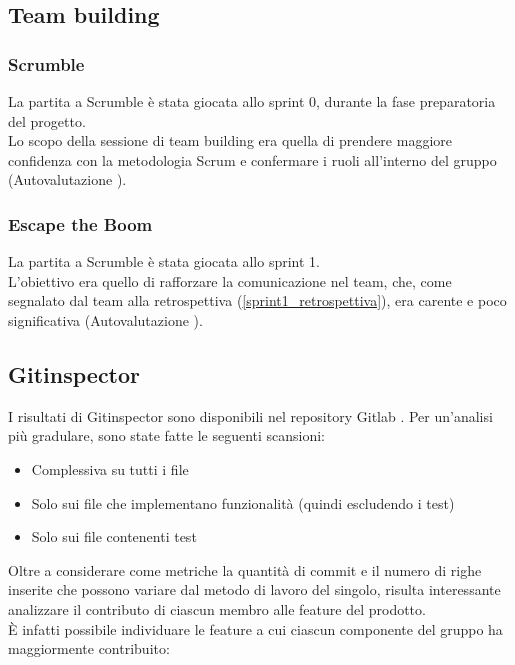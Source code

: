 \documentclass[11pt]{article}
\newcommand{\fref}[1]{\hyperref[#1]{\cref{#1}}}
\begin{document}
\subsection{Team building}
\subsubsection{Scrumble}
La partita a Scrumble è stata giocata allo sprint 0, durante la fase preparatoria del progetto.\\
Lo scopo della sessione di team building era quella di prendere maggiore confidenza con la metodologia Scrum e 
confermare i ruoli all'interno del gruppo (Autovalutazione \cite{gqm_scrumble}).

\subsubsection{Escape the Boom}
La partita a Scrumble è stata giocata allo sprint 1.\\
L'obiettivo era quello di rafforzare la comunicazione nel team, che, come segnalato dal team alla retrospettiva (\fref{sprint1_retrospettiva}),
era carente e poco significativa (Autovalutazione \cite{gqm_escapetheboom}).


\subsection{Gitinspector}
I risultati di Gitinspector sono disponibili nel repository Gitlab \cite{gitinspector}. 
Per un'analisi più gradulare, sono state fatte le seguenti scansioni:
\begin{itemize}
    \item Complessiva su tutti i file
    \item Solo sui file che implementano funzionalità (quindi escludendo i test)
    \item Solo sui file contenenti test
\end{itemize}

Oltre a considerare come metriche la quantità di commit e il numero di righe inserite che possono variare dal metodo di lavoro del singolo,
risulta interessante analizzare il contributo di ciascun membro alle feature del prodotto.\\
È infatti possibile individuare le feature a cui ciascun componente del gruppo ha maggiormente contribuito:

\end{document}
